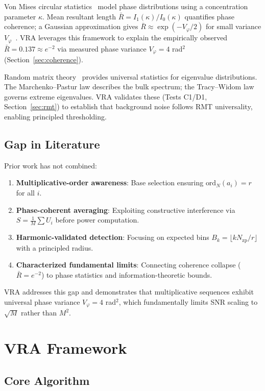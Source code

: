 \documentclass[10pt,twocolumn]{article}
\begin{document}
Von Mises circular statistics~\cite{mardia2000,fisher1993} model phase distributions using a concentration parameter $\kappa$. Mean resultant length $\bar{R} = I_1(\kappa)/I_0(\kappa)$ quantifies phase coherence; a Gaussian approximation gives $\bar{R} \approx \exp(-V_\varphi/2)$ for small variance $V_\varphi$~\cite{mardia2000}. VRA leverages this framework to explain the empirically observed $\bar{R} = 0.137 \approx e^{-2}$ via measured phase variance $V_\varphi = 4$ rad$^2$ (Section~\ref{sec:coherence}).

Random matrix theory~\cite{mehta2004} provides universal statistics for eigenvalue distributions. The Marchenko--Pastur law describes the bulk spectrum; the Tracy--Widom law governs extreme eigenvalues. VRA validates these (Tests C1/D1, Section~\ref{sec:rmt}) to establish that background noise follows RMT universality, enabling principled thresholding.

\subsection{Gap in Literature}

Prior work has not combined:
\begin{enumerate}
\item \textbf{Multiplicative-order awareness}: Base selection ensuring $\text{ord}_N(a_i) = r$ for all $i$.
\item \textbf{Phase-coherent averaging}: Exploiting constructive interference via $S = \frac{1}{M}\sum U_i$ before power computation.
\item \textbf{Harmonic-validated detection}: Focusing on expected bins $B_k = \lfloor k N_{\text{zp}}/r \rfloor$ with a principled radius.
\item \textbf{Characterized fundamental limits}: Connecting coherence collapse ($\bar{R} = e^{-2}$) to phase statistics and information-theoretic bounds.
\end{enumerate}

VRA addresses this gap and demonstrates that multiplicative sequences exhibit universal phase variance $V_\varphi = 4$ rad$^2$, which fundamentally limits SNR scaling to $\sqrt{M}$ rather than $M^2$.

\section{VRA Framework}

\subsection{Core Algorithm}
\end{document}
